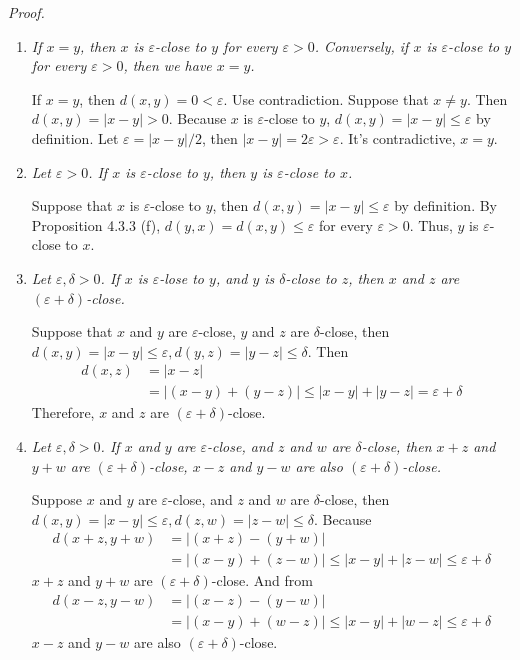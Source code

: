 \documentclass{book}
\newcommand{\pff}{\vspace{.25em}\noindent\emph{Proof.}~~}
\begin{document}
\pff
\begin{enumerate}
    \item \emph{If $x=y$, then $x$ is $\varepsilon$-close to $y$ for every $\varepsilon>0$. Conversely, if $x$ is $\varepsilon$-close to $y$ for every $\varepsilon>0$, then we have $x=y$.}

    If $x=y$, then $d(x,y)=0<\varepsilon$. Use contradiction. Suppose that $x\neq y$. Then $d(x,y)=|x-y|>0$. Because $x$ is $\varepsilon$-close to $y$, $d(x,y)=|x-y|\leq\varepsilon$ by definition. Let $\varepsilon=|x-y|/2$, then $|x-y|=2\varepsilon>\varepsilon$. It's contradictive, $x=y$.

    \item \emph{Let $\varepsilon>0$. If $x$ is $\varepsilon$-close to $y$, then $y$ is $\varepsilon$-close to $x$.}

    Suppose that $x$ is $\varepsilon$-close to $y$, then $d(x,y)=|x-y|\leq\varepsilon$ by definition. By Proposition 4.3.3 (f), $d(y,x)=d(x,y)\leq\varepsilon$ for every $\varepsilon>0$. Thus, $y$ is $\varepsilon$-close to $x$.

    \item \emph{Let $\varepsilon,\delta>0$. If $x$ is $\varepsilon$-lose to $y$, and $y$ is $\delta$-close to $z$, then $x$ and $z$ are $(\varepsilon+\delta)$-close.}

    Suppose that $x$ and $y$ are $\varepsilon$-close, $y$ and $z$ are $\delta$-close, then $d(x,y)=|x-y|\leq\varepsilon,d(y,z)=|y-z|\leq\delta$. Then
        \begin{align*}
          d(x,z)&=|x-z|\\
          &=|(x-y)+(y-z)|\leq|x-y|+|y-z|=\varepsilon+\delta
        \end{align*}
    Therefore, $x$ and $z$ are $(\varepsilon+\delta)$-close.

    \item \emph{Let $\varepsilon,\delta>0$. If $x$ and $y$ are $\varepsilon$-close, and $z$ and $w$ are $\delta$-close, then $x+z$ and $y+w$ are $(\varepsilon+\delta)$-close, $x-z$ and $y-w$ are also $(\varepsilon+\delta)$-close.}

    Suppose $x$ and $y$ are $\varepsilon$-close, and $z$ and $w$ are $\delta$-close, then $d(x,y)=|x-y|\leq\varepsilon,d(z,w)=|z-w|\leq\delta$. Because
       \begin{align*}
          d(x+z,y+w)&=|(x+z)-(y+w)|\\
          &=|(x-y)+(z-w)|\leq|x-y|+|z-w|\leq\varepsilon+\delta
       \end{align*}
    $x+z$ and $y+w$ are $(\varepsilon+\delta)$-close. And from
       \begin{align*}
          d(x-z,y-w)&=|(x-z)-(y-w)|\\
          &=|(x-y)+(w-z)|\leq|x-y|+|w-z|\leq\varepsilon+\delta
       \end{align*}
    $x-z$ and $y-w$ are also $(\varepsilon+\delta)$-close.


\end{enumerate}
\end{document}
